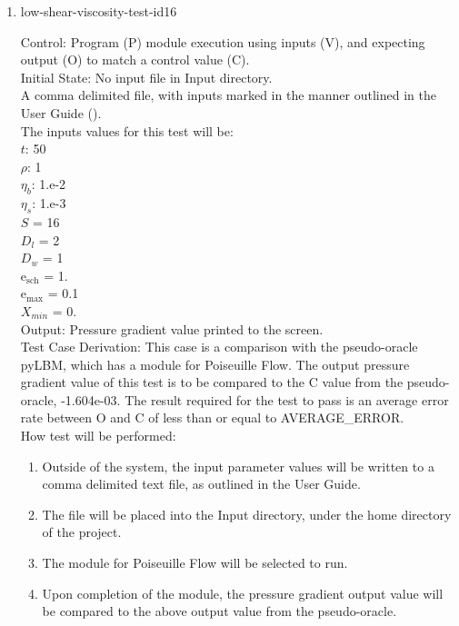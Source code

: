 \documentclass[12pt, titlepage]{article}
\begin{document}
\begin{enumerate}
\item{low-shear-viscosity-test-id16\\}

Control: Program (P) module execution using inputs (V), and expecting output (O) to match a control value (C).\\
					
Initial State: No input file in Input directory.\\
					
A comma delimited file, with inputs marked in the manner outlined in the User Guide (\citet{LBM_UserGuide_PM}).\\The inputs values for this test will be:\\
$t$: 50\\
$\rho$: 1\\
$\eta_b$: 1.e-2\\
$\eta_s$: 1.e-3\\
$S$ = 16\\
$D_{l}$ = 2\\
$D_{w}$ = 1\\
$\mathrm{e_{sch}}$ = 1.\\
$\mathrm{e_{max}}$ = 0.1\\
$X_{min}$ = 0.\\

					
Output: Pressure gradient value printed to the screen. \\ 

Test Case Derivation: This case is a comparison with the pseudo-oracle pyLBM, which has a module for Poiseuille Flow. The output pressure gradient value of this test is to be compared to the C value from the pseudo-oracle, -1.604e-03. The result required for the test to pass is an average error rate between O and C of less than or equal to AVERAGE\_ERROR.\\

					
How test will be performed: 

\begin{enumerate}
\item Outside of the system, the input parameter values will be written to a comma delimited text file, as outlined in the User Guide.
\item The file will be placed into the Input directory, under the home directory of the project.
\item The module for Poiseuille Flow will be selected to run.
\item Upon completion of the module, the pressure gradient output value will be compared to the above output value from the pseudo-oracle.
\end{enumerate}	


\end{enumerate}
\end{document}
